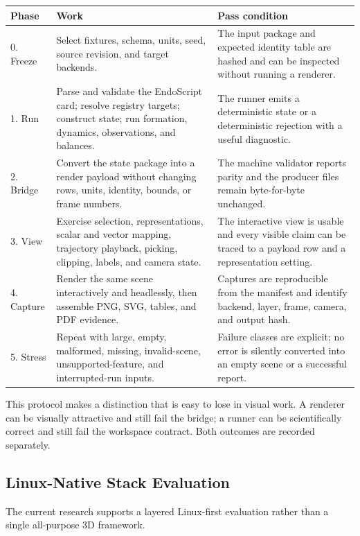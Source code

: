 \documentclass[11pt,a4paper]{article}
\begin{document}
\begin{center}
\small
\begin{tabular}{p{2.0cm}p{5.0cm}p{6.8cm}}
\toprule
\textbf{Phase} & \textbf{Work} & \textbf{Pass condition} \\
\midrule
0. Freeze & Select fixtures, schema, units, seed, source revision, and target
backends. & The input package and expected identity table are hashed and can
be inspected without running a renderer. \\
1. Run & Parse and validate the EndoScript card; resolve registry targets;
construct state; run formation, dynamics, observations, and balances. & The
runner emits a deterministic state or a deterministic rejection with a useful
diagnostic. \\
2. Bridge & Convert the state package into a render payload without changing
rows, units, identity, bounds, or frame numbers. & The machine validator reports
parity and the producer files remain byte-for-byte unchanged. \\
3. View & Exercise selection, representations, scalar and vector mapping,
trajectory playback, picking, clipping, labels, and camera state. & The
interactive view is usable and every visible claim can be traced to a payload
row and a representation setting. \\
4. Capture & Render the same scene interactively and headlessly, then assemble
PNG, SVG, tables, and PDF evidence. & Captures are reproducible from the
manifest and identify backend, layer, frame, camera, and output hash. \\
5. Stress & Repeat with large, empty, malformed, missing, invalid-scene,
unsupported-feature, and interrupted-run inputs. & Failure classes are explicit;
no error is silently converted into an empty scene or a successful report. \\
\bottomrule
\end{tabular}
\end{center}

This protocol makes a distinction that is easy to lose in visual work.  A
renderer can be visually attractive and still fail the bridge; a runner can be
scientifically correct and still fail the workspace contract.  Both outcomes
are recorded separately.

\subsection{Linux-Native Stack Evaluation}

The current research supports a layered Linux-first evaluation rather than a
single all-purpose 3D framework.
\end{document}

